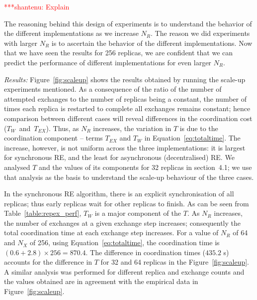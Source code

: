 \documentclass{rspublic}
\newcommand{\jhanote}[1]{ {\textcolor{red} { ***shantenu: #1 }}}
\newcommand{\alnote}[1]{ {\textcolor{blue} { ***andre: #1 }}}
\newcommand{\athotanote}[1]{ {\textcolor{green} { ***athota: #1 }}}
\newcommand{\alnote}[1]{}
\newcommand{\athotanote}[1]{}
\newcommand{\jhanote}[1]{}
\begin{document}
\jhanote{Explain}

The reasoning behind this design of experiments is to understand the
behavior of the different implementations as we increase $N_R$. The
reason we did experiments with larger $N_R$ is to ascertain the
behavior of the different implementations. Now that we have seen the
results for 256 replicas, we are confident that we can predict the
performance of different implementations for even larger $N_R$.



{\it Results:} Figure~\ref{fig:scaleup} shows the results obtained by
running the scale-up experiments mentioned.  %
As a consequence of the ratio of the number of attempted exchanges to
the number of replicas being a constant, the number of times each
replica is restarted to complete all exchanges remains constant; hence
comparison between different cases will reveal differences in the
coordination cost ($T_W$~and~$T_{EX}$).  Thus, as $N_R$ increases, the
variation in $T$ is due to the coordination component -- terms
$T_{EX}$ and $T_W$ in Equation~\ref{eq:totaltime}.  The increase,
however, is not uniform across the three implementations: it is
largest for synchronous RE, and the least for asynchronous
(decentralised) RE.  We analysed $T$ and the values of its components
for 32 replicas in section~4.1; we use that analysis as the basis to
understand the scale-up behaviour of the three cases.
 
In the synchronous RE algorithm, there is an explicit synchronisation
of all replicas; thus early replicas wait for other replicas to
finish. As can be seen from Table~\ref{table:repex_perf}, $T_W$ is a
major component of the $T$.  As $N_R$ increases, the number of
exchanges at a given exchange step increases; consequently the total
coordination time at each exchange step increases.  For a value of
$N_R$ of 64 and $N_X$ of 256, using Equation~\ref{eq:totaltime}, the
coordination time is $(0.6+2.8) \times 256 = 870.4$.  The difference
in coordination times ($435.2$ s) accounts for the difference
in $T$ for 32 and 64 replicas in the
Figure~\ref{fig:scaleup}. %
A similar analysis was performed for different replica and exchange
counts and the values obtained are in agreement with the empirical
data in Figure~\ref{fig:scaleup}.
\end{document}
